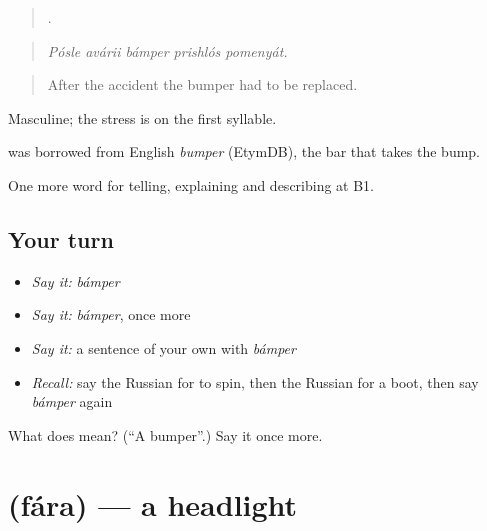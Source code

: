 \begin{quote}
    .
\end{quote}

\begin{quote}
\emph{Pósle avárii bámper prishlós pomenyát.}
\end{quote}

\begin{quote}
After the accident the bumper had to be replaced.
\end{quote}

Masculine; the stress is on the first syllable.

\begin{cousinweb}
\emph{} was borrowed from English \emph{bumper} (EtymDB), the bar that takes the bump.
\end{cousinweb}

\begin{grammarlens}[title={What you've built}]
One more word for telling, explaining and describing at B1.
\end{grammarlens}

\subsection*{Your turn}
\begin{itemize}
\raggedright
  \item \emph{Say it:} \emph{bámper}
  \item \emph{Say it:} \emph{bámper}, once more
  \item \emph{Say it:} a sentence of your own with \emph{bámper}
  \item \emph{Recall:} say the Russian for to spin, then the Russian for a boot, then say \emph{bámper} again
\end{itemize}

\begin{tcolorbox}[breakable,colback=teal!4,colframe=teal!35!black,title={Before you move on}]
What does  mean? (\textquotedblleft{}A bumper\textquotedblright{}.) Say it once more.
\end{tcolorbox}
\section[\texorpdfstring{\ru{фара} (fára)}{фара (fára)}]{ (fára) — a headlight}

\label{lesson:RU-C406-fara}



